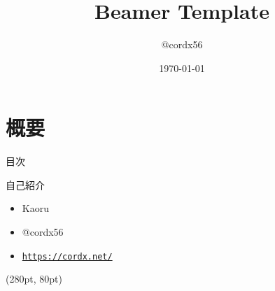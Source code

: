 \documentclass[12pt,dvipdfmx,uplatex]{beamer}
\title{Beamer Template}
\author{@cordx56}
\date{\today}
\institute{Institute}
\begin{document}
 
    \frame{\maketitle}

    \section{概要}
    \begin{frame}{目次}
        \tableofcontents
    \end{frame}
    \begin{frame}{自己紹介}
        \begin{itemize}
            \item \textrm{Kaoru}
            \item @cordx56
            \item \texttt{\href{https://cordx.net/}{https://cordx.net/}}
        \end{itemize}
        \begin{textblock*}{0.2\linewidth} (280pt, 80pt)
        \end{textblock*}
    \end{frame}
\end{document}
